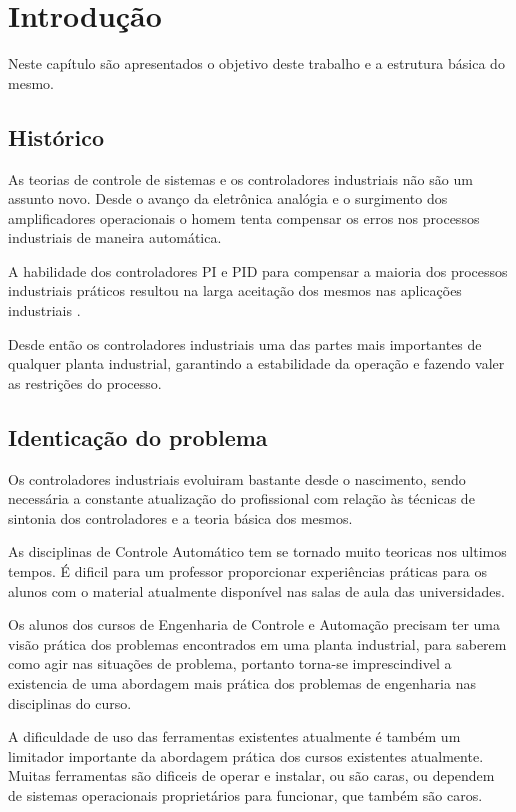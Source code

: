 \chapter{Introdução\label{cap:introducao}}

Neste capítulo são apresentados o objetivo deste trabalho e a estrutura básica
do mesmo.

\section{Histórico}

    As teorias de controle de sistemas e os controladores industriais não são um assunto
    novo. Desde o avanço da eletrônica analógia e o surgimento dos amplificadores
    operacionais o homem tenta compensar os erros nos processos industriais de maneira
    automática.

    A habilidade dos controladores \ac{PI} e \ac{PID} para compensar a maioria dos processos
    industriais práticos resultou na larga aceitação dos mesmos nas aplicações industriais
    \cite{Dwyer}.

    Desde então os controladores industriais uma das partes mais importantes de qualquer
    planta industrial, garantindo a estabilidade da operação e fazendo valer as restrições
    do processo.

\section{Identicação do problema}
    
    Os controladores industriais evoluiram bastante desde o nascimento, sendo necessária
    a constante atualização do profissional com relação às técnicas de sintonia dos
    controladores e a teoria básica dos mesmos.

    As disciplinas de Controle Automático tem se tornado muito teoricas nos ultimos
    tempos. É dificil para um professor proporcionar experiências práticas para os
    alunos com o material atualmente disponível nas salas de aula das universidades.

    Os alunos dos cursos de Engenharia de Controle e Automação precisam ter uma
    visão prática dos problemas encontrados em uma planta industrial, para saberem
    como agir nas situações de problema, portanto torna-se imprescindivel a existencia
    de uma abordagem mais prática dos problemas de engenharia nas disciplinas do curso.

    A dificuldade de uso das ferramentas existentes atualmente é também um limitador
    importante da abordagem prática dos cursos existentes atualmente. Muitas ferramentas
    são dificeis de operar e instalar, ou são caras, ou dependem de sistemas operacionais
    proprietários para funcionar, que também são caros.

